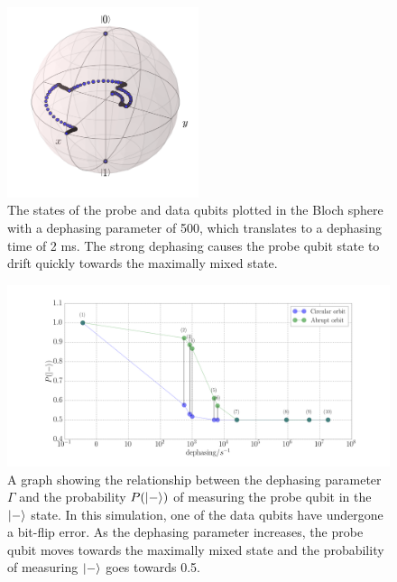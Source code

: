 \begin{figure}[!h]
  \centering
    \includegraphics[width=0.5\textwidth]{../Figures/Circ_orbit_odd_500_dephasing.png}
      \caption{The states of the probe and data qubits plotted in the Bloch sphere with a dephasing parameter of 500, which translates to a dephasing time of 2 ms. The strong dephasing causes the probe qubit state to drift quickly towards the maximally mixed state. }
      \label{fig:BlochsphereDephasing2}
\end{figure}




\begin{figure}[h]
	\centering
	\includegraphics[width=\textwidth]{../Figures/dephasing_plot.png}
		\caption{A graph showing the relationship between the dephasing parameter $\Gamma$ and the probability $P(\ket{-})$ of measuring the probe qubit in the $\ket{-}$ state. In this simulation, one of the data qubits have undergone a bit-flip error. As the dephasing parameter increases, the probe qubit moves towards the maximally mixed state and the probability of measuring $\ket{-}$ goes towards 0.5.}
		\label{fig:phaseplot}
\end{figure}





